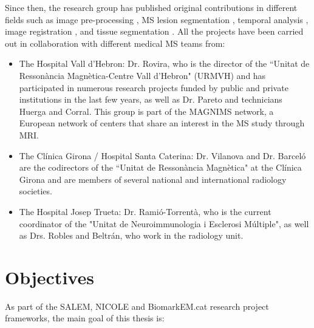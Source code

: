 Since then, the research group has published original contributions in different fields such as image pre-processing \cite{Roura2014}, MS lesion segmentation \cite{Cabezas2014, Cabezas2014b, Llado2012, Roura2015}, temporal analysis \cite{Ganiler2014,Llado2012b}, image registration \cite{Diez2014, Roura2015b}, and tissue segmentation \cite{Cabezas2011}. All the projects have been carried out in collaboration with different medical MS teams from:

\begin{itemize}

\item The Hospital Vall d'Hebron: Dr. Rovira, who is the director of the ``Unitat de Resson\`{a}ncia Magn\`{e}tica-Centre Vall d'Hebron" (URMVH) and has participated in numerous research projects funded by public and private institutions in the last few years, as well as Dr. Pareto and technicians Huerga and Corral. This group is part of the MAGNIMS network, a European network of centers that share an interest in the MS study through MRI.
 
	 \item The Cl\'{i}nica Girona / Hospital Santa Caterina: Dr. Vilanova and Dr. Barcel\'{o} are the codirectors of the ``Unitat de Resson\`{a}ncia Magn\`{e}tica" at the Cl\'{i}nica Girona and are members of several national and international radiology societies.
 
	\item The Hospital Josep Trueta: Dr. Rami\'{o}-Torrent\`{a}, who is the current coordinator of the "Unitat de Neuroimmunologia i Esclerosi M\'{u}ltiple", as well as Drs. Robles and Beltr\'{a}n, who work in the radiology unit.

\end{itemize}

\section{Objectives}
\label{sec:objectives}

As part of the SALEM, NICOLE and BiomarkEM.cat research project frameworks, the main goal of this thesis is: 

\begin{center}
\end{center}


